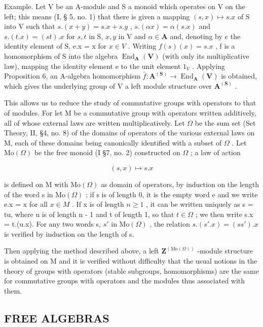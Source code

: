 Example. Let V be an A-module and S a monoid which operates on V on the left; this means (I, § 5, no. 1) that there is given a mapping \((s, x) \mapsto s.x\) of S into V such that \(s.(x + y) = s.x + s.y\) , \(s.(\alpha x) = \alpha(s.x)\) and \(s.(t.x) = (st).x\) for \(s, t\) in S, \(x, y\) in V and \(\alpha \in \mathbf{A}\) and, denoting by \(e\) the identity element of S, e.x = x for \(x \in V\) . Writing \(f(s)(x) = s.x\) , f is a homomorphism of S into the algebra \(\operatorname{End}_{\mathbf{A}}(\mathbf{V})\) (with only its multiplicative law), mapping the identity element e to the unit element \(1_{V}\) . Applying Proposition 6, an A-algebra homomorphism \(\bar{f}: \mathbf{A}^{(\mathbf{S})} \to \operatorname{End}_{\mathbf{A}}(\mathbf{V})\) is obtained, which gives the underlying group of V a left module structure over \(\mathbf{A}^{(\mathbf{S})}\) .

This allows us to reduce the study of commutative groups with operators to that of modules. For let M be a commutative group with operators written additively, all of whose external laws are written multiplicatively. Let \(\Omega\) be the sum set (Set Theory, II, §4, no. 8) of the domains of operators of the various external laws on M, each of these domains being canonically identified with a subset of \(\Omega\) . Let \(\mathrm{Mo}(\Omega)\) be the free monoid (I §7, no. 2) constructed on \(\Omega\) ; a law of action

\[
(s, x) \mapsto s. x
\]

is defined on M with \(\mathrm{Mo}(\Omega)\) as domain of operators, by induction on the length of the word s in \(\mathrm{Mo}(\Omega)\) ; if s is of length 0, it is the empty word e and we write e.x = x for all \(x \in M\) . If x is of length \(n \geqslant 1\) , it can be written uniquely as s = tu, where u is of length n - 1 and t of length 1, so that \(t \in \Omega\) ; we then write s.x = t.(u.x). For any two words s, \(s'\) in \(\mathrm{Mo}(\Omega)\) , the relation \(s.(s'.x) = (ss').x\) is verified by induction on the length of s.

Then applying the method described above, a left \(\mathbf{Z}^{(\mathrm{Mo}(\Omega))}\) -module structure is obtained on M and it is verified without difficulty that the usual notions in the theory of groups with operators (stable subgroups, homomorphisms) are the same for commutative groups with operators and the modules thus associated with them.

\subsection{FREE ALGEBRAS}

